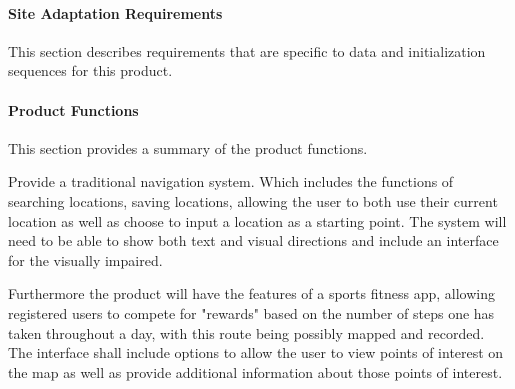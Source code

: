 \documentclass[]{article}
\begin{document}
\paragraph{Site Adaptation Requirements}
\begin{center}
	This section describes requirements that are specific to data and initialization sequences for this product.
	
\end{center}

\paragraph{Product Functions}
\begin{center}
	This section provides a summary of the product functions.
	
	Provide a traditional navigation system. Which includes the functions of searching locations, saving locations, allowing the user to both use their current location as well as choose to input a location as a starting point. The system will need to be able to show both text and visual directions and include an interface for the visually impaired.
	
	Furthermore the product will have the features of a sports fitness app, allowing registered users to compete for "rewards" based on the number of steps one has taken throughout a day, with this route being possibly mapped and recorded.
	The interface shall include options to allow the user to view points of interest on the map as well as provide additional information about those points of interest.
\end{center}
\end{document}
